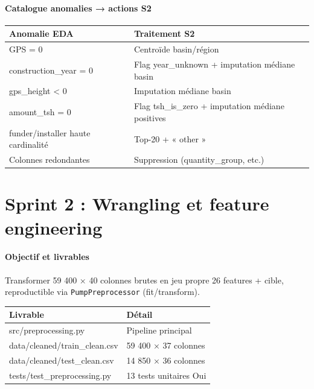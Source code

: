 \documentclass[11pt,a4paper]{report}
\begin{document}
\subsubsection{Catalogue anomalies → actions S2}



\begin{longtable}{@{}ll@{}}
\toprule
Anomalie EDA & Traitement S2 \\
\midrule
GPS = 0 & Centroïde basin/région \\
construction\_year = 0 & Flag year\_unknown + imputation médiane basin \\
gps\_height < 0 & Imputation médiane basin \\
amount\_tsh = 0 & Flag tsh\_is\_zero + imputation médiane positives \\
funder/installer haute cardinalité & Top-20 + « other » \\
Colonnes redondantes & Suppression (quantity\_group, etc.) \\
\bottomrule
\end{longtable}






\chapter{Sprint 2 : Wrangling et feature engineering}



\subsubsection{Objectif et livrables}



Transformer 59 400 × 40 colonnes brutes en jeu propre 26 features + cible, reproductible via \texttt{PumpPreprocessor} (fit/transform).



\begin{longtable}{@{}ll@{}}
\toprule
Livrable & Détail \\
\midrule
src/preprocessing.py & Pipeline principal \\
data/cleaned/train\_clean.csv & 59 400 × 37 colonnes \\
data/cleaned/test\_clean.csv & 14 850 × 36 colonnes \\
tests/test\_preprocessing.py & 13 tests unitaires Oui \\
\bottomrule
\end{longtable}
\end{document}
